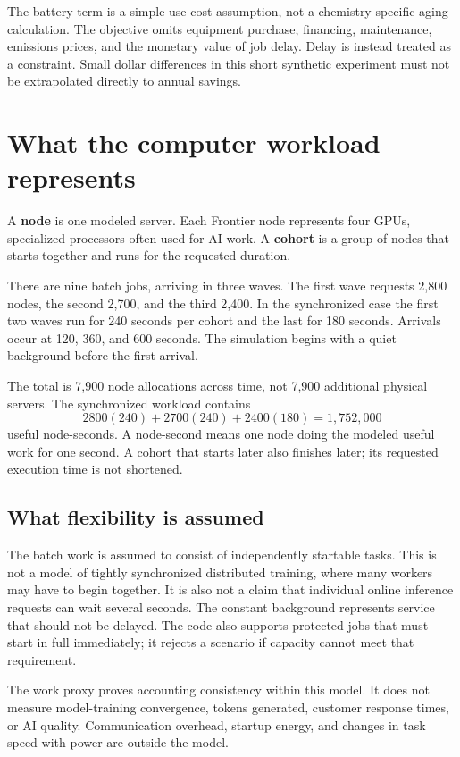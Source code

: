 \documentclass[11pt]{article}
\begin{document}
The battery term is a simple use-cost assumption, not a chemistry-specific
aging calculation. The objective omits equipment purchase, financing,
maintenance, emissions prices, and the monetary value of job delay.
Delay is instead treated as a constraint. Small dollar differences in this
short synthetic experiment must not be extrapolated directly to annual savings.

\section{What the computer workload represents}

A \textbf{node} is one modeled server. Each Frontier node represents four
GPUs, specialized processors often used for AI work. A \textbf{cohort}
is a group of nodes that starts together and runs for the requested duration.

There are nine batch jobs, arriving in three waves. The first wave requests
2,800 nodes, the second 2,700, and the third 2,400. In the synchronized
case the first two waves run for 240 seconds per cohort and the last
for 180 seconds. Arrivals occur at 120, 360, and 600 seconds.
The simulation begins with a quiet background before the first arrival.

The total is 7,900 node allocations across time, not 7,900 additional
physical servers. The synchronized workload contains
\[
2800(240)+2700(240)+2400(180)=1{,}752{,}000
\]
useful node-seconds. A node-second means one node doing the modeled useful
work for one second. A cohort that starts later also finishes later;
its requested execution time is not shortened.

\subsection{What flexibility is assumed}

The batch work is assumed to consist of independently startable tasks.
This is not a model of tightly synchronized distributed training,
where many workers may have to begin together. It is also not a claim
that individual online inference requests can wait several seconds.
The constant background represents service that should not be delayed.
The code also supports protected jobs that must start in full immediately;
it rejects a scenario if capacity cannot meet that requirement.

The work proxy proves accounting consistency within this model.
It does not measure model-training convergence, tokens generated,
customer response times, or AI quality. Communication overhead,
startup energy, and changes in task speed with power are outside the model.
\end{document}
